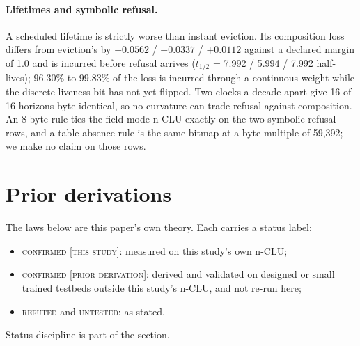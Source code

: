 \documentclass{article} %
\begin{document}
\paragraph{Lifetimes and symbolic refusal.} A scheduled lifetime is strictly worse than instant
eviction. Its composition loss differs from eviction's by $+0.0562$ / $+0.0337$ / $+0.0112$ against a
declared margin of 1.0 and is incurred before refusal arrives ($t_{1/2}$ = 7.992 / 5.994 / %
7.992 half-lives); 96.30\% to 99.83\% of the loss is incurred through a continuous weight while the
discrete liveness bit has not yet flipped. %
Two clocks a decade apart give 16 of 16 horizons byte-identical, so no curvature can trade refusal
against composition. An 8-byte rule ties the field-mode n-CLU exactly on the two symbolic refusal rows,
and a table-absence rule is the same bitmap at a byte multiple of 59,392; we make no claim on those
rows. %

\section{Prior derivations}
\label{app:shorts}

The laws below are this paper's own theory. Each carries a status label:
\begin{itemize}[leftmargin=*,nosep]
\item \textsc{confirmed [this study]}: measured on this study's own n-CLU;
\item \textsc{confirmed [prior derivation]}: derived and validated on designed or small trained
  testbeds outside this study's n-CLU, and not re-run here;
\item \textsc{refuted} and \textsc{untested}: as stated.
\end{itemize}
Status discipline is part of the section.
\end{document}
